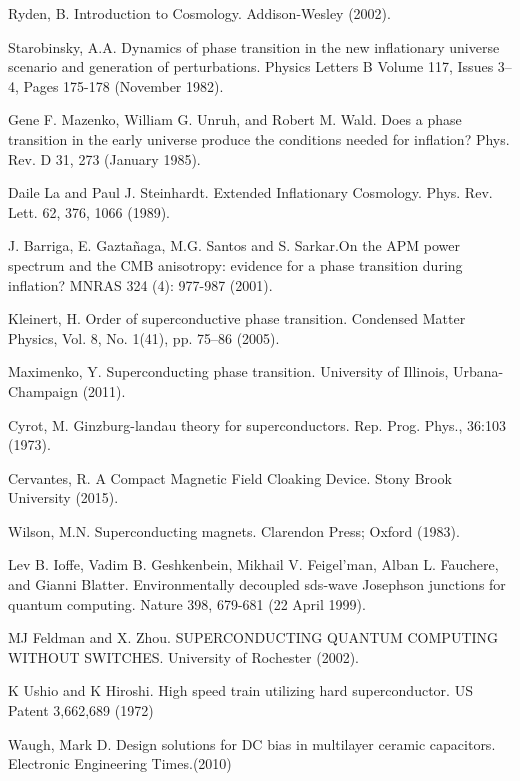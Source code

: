 \documentclass[%
 reprint,
 amsmath,amssymb,
 aps,
 pra,
]{revtex4-1}
\begin{document}
\begin{thebibliography}{6}
	Ryden, B. Introduction to Cosmology. Addison-Wesley (2002).
	
	Starobinsky, A.A. Dynamics of phase transition in the new inflationary universe scenario and generation of perturbations. Physics Letters B Volume 117, Issues 3–4, Pages 175-178 (November 1982).
	
	Gene F. Mazenko, William G. Unruh, and Robert M. Wald. Does a phase transition in the early universe produce the conditions needed for inflation? Phys. Rev. D 31, 273 (January 1985).
	
	Daile La and Paul J. Steinhardt. Extended Inflationary Cosmology. Phys. Rev. Lett. 62, 376, 1066 (1989).
	
	J. Barriga, E. Gaztañaga, M.G. Santos and S. Sarkar.On the APM power spectrum and the CMB anisotropy: evidence for a phase transition during inflation? MNRAS 324 (4): 977-987 (2001). 
	
	Kleinert, H. Order of superconductive phase transition. Condensed Matter Physics, Vol. 8, No. 1(41), pp. 75–86 (2005).
	
	Maximenko, Y. Superconducting phase transition. University of Illinois, Urbana-Champaign (2011).
	
	Cyrot, M. Ginzburg-landau theory for superconductors. Rep. Prog. Phys., 36:103 (1973).
	
	Cervantes, R. A Compact Magnetic Field Cloaking Device. Stony Brook University (2015).
	
	Wilson, M.N. Superconducting magnets. Clarendon Press; Oxford (1983).
	
	Lev B. Ioffe, Vadim B. Geshkenbein, Mikhail V. Feigel'man, Alban L. Fauchere, and Gianni Blatter. Environmentally decoupled sds-wave Josephson junctions for quantum computing. Nature 398, 679-681 (22 April 1999).
	
	MJ Feldman and X. Zhou. SUPERCONDUCTING QUANTUM COMPUTING WITHOUT SWITCHES. University of Rochester (2002).
	
	K Ushio and K Hiroshi. High speed train utilizing hard superconductor. US Patent 3,662,689 (1972)
	
	Waugh, Mark D. Design solutions for DC bias in multilayer ceramic capacitors. Electronic Engineering Times.(2010)
	

\end{thebibliography}
\end{document}
